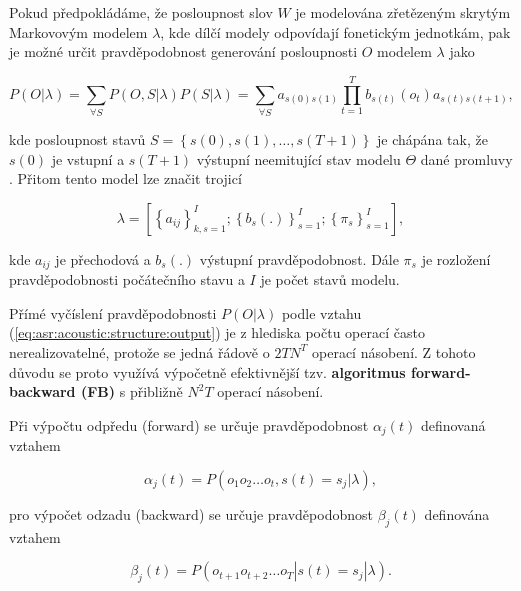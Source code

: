Pokud předpokládáme, že posloupnost slov $W$ je modelována zřetězeným skrytým Markovovým modelem $\lambda$, kde dílčí modely odpovídají fonetickým jednotkám, pak je možné určit pravděpodobnost generování posloupnosti $O$ modelem $\lambda$ jako

\begin{equation}
  P\left(O|\lambda\right) = \sum_{\forall S} P\left(O, S| \lambda\right)P\left(S|\lambda\right) = \sum_{\forall S} a_{s\left(0\right)s\left(1\right)} \prod_{t=1}^{T} b_{s\left(t\right)}\left(o_t\right)a_{s\left(t\right)s\left(t+1\right)},
  \label{eq:asr:acoustic:structure:output}
\end{equation}

\noindent kde posloupnost stavů $S = \left\{s\left(0\right), s\left(1\right),\dots, s\left(T+1\right)\right\}$ je chápána tak, že $s\left(0\right)$ je vstupní a $s\left(T+1\right)$ výstupní neemitující stav modelu $\Theta$ dané promluvy \cite{Psutka2006}. Přitom tento model lze značit trojicí

\begin{equation}
  \lambda = \left[\left\{a_{ij}\right\}_{k,s=1}^{I}; \left\{b_s(.)\right\}_{s=1}^{I};\left\{\pi_{s}\right\}_{s=1}^{I}\right],
  \label{eq:asr:acoustic:structure:marking}
\end{equation}

\noindent kde $a_{ij}$ je přechodová a $b_s(.)$ výstupní pravděpodobnost. Dále $\pi_s$ je rozložení pravděpodobnosti počátečního stavu a $I$ je počet stavů modelu.

Přímé vyčíslení pravděpodobnosti $P\left(O|\lambda\right)$ podle vztahu (\ref{eq:asr:acoustic:structure:output}) je z hlediska počtu operací často nerealizovatelné, protože se jedná řádově o $2TN^{T}$ operací násobení. Z tohoto důvodu se proto využívá výpočetně efektivnější tzv. \textbf{algoritmus forward-backward (FB)} s přibližně $N^{2}T$ operací násobení.

Při výpočtu odpředu (forward) se určuje pravděpodobnost $\alpha_j\left(t\right)$ definovaná vztahem

\begin{equation}
  \alpha_{j}\left(t\right) = P\left(o_1o_2\dots o_t, s\left(t\right)=s_j|\lambda\right),
  \label{eq:asr:acoustic:structure:forward}
\end{equation}

\noindent pro výpočet odzadu (backward) se určuje pravděpodobnost $\beta_j\left(t\right)$ definována vztahem


\begin{equation}
  \beta_j\left(t\right) = P\left(o_{t+1}o_{t+2}\dots o_T|s\left(t\right)=s_j|\lambda\right).
  \label{eq:asr:acoustic:structure:backward}
\end{equation}

